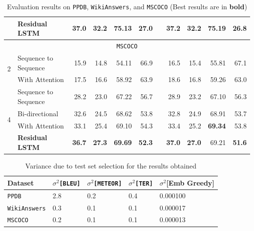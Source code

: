 \begin{center}
\begin{table}
\begin{tabular}{@{}clrrrrcrrrr}
        & \textbf{Residual LSTM}                  & \textbf{37.0}  & \textbf{32.2}  & \textbf{75.13}  & \textbf{27.0} & & \textbf{37.2}  & \textbf{32.2}  & \textbf{75.19} & \textbf{26.8} \tabularnewline
        \bottomrule
        \multicolumn{11}{c}{\texttt{MSCOCO}}  \tabularnewline \midrule
        \multirow{2}{*}{2} & Sequence to Sequence & 15.9  & 14.8  &   54.11 & 66.9 & &  16.5 & 15.4  & 55.81 & 67.1 \tabularnewline
        & With Attention                          & 17.5  & 16.6  &   58.92 & 63.9 & &  18.6 & 16.8  & 59.26 & 63.0 \tabularnewline
        \midrule                                                                                           
        \multirow{4}{*}{4} & Sequence to Sequence & 28.2  & 23.0  &   67.22 & 56.7 & & 28.9  & 23.2  & 67.10 & 56.3 \tabularnewline
        & Bi-directional                           & 32.6  & 24.5  &   68.62 & 53.8 & & 32.8  & 24.9  & 68.91 & 53.7 \tabularnewline
        & With Attention                          & 33.1  & 25.4  &   69.10 & 54.3 & & 33.4  & 25.2  & \textbf{69.34} & 53.8 \tabularnewline
        & \textbf{Residual LSTM}                  & \textbf{36.7}  & \textbf{27.3}  &  \textbf{69.69} & \textbf{52.3} & & \textbf{37.0}  & \textbf{27.0}  & 69.21 & \textbf{51.6} \tabularnewline
        \bottomrule
    \end{tabular}
    \caption[Results]{Evaluation results on \texttt{PPDB}, \texttt{WikiAnswers}, and \texttt{MSCOCO} (Best results are in \textbf{bold})}
\end{table}
\end{center}
 
\begin{table}
\centering
{}
\begin{tabular}{lllll}
\midrule
\multicolumn{1}{l}{Dataset} & \multicolumn{1}{c}{$\sigma^2$\texttt{[BLEU]}} & \multicolumn{1}{c}{$\sigma^2$\texttt{[METEOR]}} & $\sigma^2$\texttt{[TER]} & \multicolumn{1}{c}{$\sigma^2$[Emb Greedy]} \\
\midrule
\texttt{PPDB}                        & 2.8                      & 0.2                        & 0.4 & 0.000100 \\
\texttt{WikiAnswers}                     & 0.3                      & 0.1                        & 0.1 & 0.000017 \\
\texttt{MSCOCO}                      & 0.2                      & 0.1                        & 0.1 & 0.000013  \\
\midrule
\end{tabular}
\caption[Test Set Variance]{Variance due to test set selection for the results obtained}
\label{vartest}
\end{table}
 
